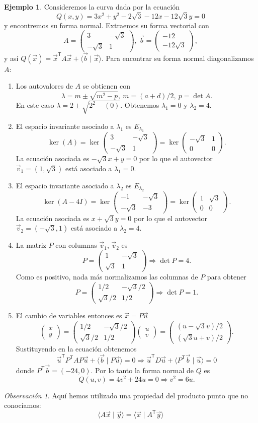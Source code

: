 \documentclass[12pt]{article}
\theoremstyle{plain}
\theoremstyle{definition}
\newtheorem{Ex}[Th]{Ejemplo}           %
\theoremstyle{remark}
\newtheorem*{Rmk}{Observación}      %
\newcommand{\la}{\lambda}           %
\newcommand{\sT}{\mathsf{T}}        %
\renewcommand{\:}{\colon}           %
\renewcommand{\.}{\Cdot}                %
\newcommand{\twobyone}[2]{\begin{pmatrix} %
  #1 \\ #2 \end{pmatrix}}
\newcommand{\twobytwo}[4]{\begin{pmatrix} %
    #1 & #2 \\ #3 & #4 \end{pmatrix}}
\newcommand{\To}{\Rightarrow}
\begin{document}
\begin{multicols}{2}
\begin{Ex}
  Consideremos la curva dada por la ecuación
  $$Q(x,y)=3x^2+y^2-2\sqrt{3}-12x-12\sqrt{3}y=0$$
  y encontremos su forma normal. Extraemos su forma vectorial con 
  $$A=\twobytwo{3}{-\sqrt{3}}{-\sqrt{3}}{1},\ \vec{b}=\twobyone{-12}{-12\sqrt{3}},$$
  y así $Q(\vec{x})=\vec{x}^\sT A\vec{x}+\langle\vec{b}\mid \vec{x}\rangle$. Para encontrar su forma normal diagonalizamos $A$:
  \begin{enumerate}
    \itemsep=-0.5em 
    \item Los autovalores de $A$ se obtienen con 
    $$\la=m\pm\sqrt{m^2-p},\ m=(a+d)/2,\ p=\det A.$$
    En este caso $\la=2\pm\sqrt{2^2-(0)}$. Obtenemos $\la_1=0$ y $\la_2=4$.
    \item El espacio invariante asociado a $\la_1$ es $E_{\la_1}$
    $$\ker(A)=\ker\twobytwo{3}{-\sqrt{3}}{-\sqrt{3}}{1}=\ker\twobytwo{-\sqrt{3}}{1}{0}{0}.$$
    La ecuación asociada es $-\sqrt{3}x+y=0$ por lo que el autovector $\vec{v}_1=(1,\sqrt{3})$ está asociado a $\la_1=0$.
    \item El espacio invariante asociado a $\la_2$ es $E_{\la_2}$
    $$\ker(A-4I)=\ker\twobytwo{-1}{-\sqrt{3}}{-\sqrt{3}}{-3}=\ker\twobytwo{1}{\sqrt{3}}{0}{0}.$$
    La ecuación asociada es $x+\sqrt{3}y=0$ por lo que el autovector $\vec{v}_2=(-\sqrt{3},1)$ está asociado a $\la_2=4$.
    \item La matriz $P$ con columnas $\vec{v}_1$, $\vec{v}_2$ es
    $$P=\twobytwo{1}{-\sqrt{3}}{\sqrt{3}}{1}\To\det P=4.$$
    Como es positivo, nada más normalizamos las columnas de $P$ para obtener
    $$P=\twobytwo{1/2}{-\sqrt{3}/2}{\sqrt{3}/2}{1/2}\To\det P=1.$$
    \item El cambio de variables entonces es $\vec{x}=P\vec{u}$
    $$\twobyone{x}{y}=\twobytwo{1/2}{-\sqrt{3}/2}{\sqrt{3}/2}{1/2}\twobyone{u}{v}=\twobyone{(u-\sqrt{3}v)/2}{(\sqrt{3}u+v)/2}.$$
    Sustituyendo en la ecuación obtenemos 
    $$\vec{u}^\sT P^\sT AP\vec{u}+\langle\vec{b}\mid P\vec{u}\rangle=0\To \vec{u}^\sT D\vec{u}+\langle P^\sT \vec{b}\mid \vec{u}\rangle=0$$
    donde $P^\sT\vec{b}=(-24,0)$.
    Por lo tanto la forma normal de $Q$ es
    $$Q(u,v)=4v^2+24u=0\To v^2=6u.$$
  \end{enumerate}
\end{Ex}
\begin{Rmk}
  Aquí hemos utilizado una propiedad del producto punto que no conocíamos:
  $$\langle A\vec{x}\mid\vec{y}\rangle=\langle \vec{x}\mid A^\sT\vec{y}\rangle$$
\end{Rmk}


\end{multicols}
\end{document}

